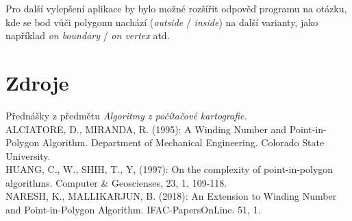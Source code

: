 \documentclass[a4paper,12pt]{article}
\begin{document}
     Pro další vylepšení aplikace by bylo možné rozšířit odpověď programu na otázku, kde se bod vůči polygonu nachází (\emph{outside} / \emph{inside}) na další varianty, jako například \emph{on boundary} / \emph{on vertex}  atd.
    \newpage
    \section{Zdroje}
    Přednášky z předmětu \emph{Algoritmy z počítačové kartografie.}\\

    ALCIATORE, D., MIRANDA, R. (1995): A Winding Number and Point-in-Polygon Algorithm. Department of Mechanical Engineering. Colorado State University.\\

    HUANG, C., W., SHIH, T., Y, (1997): On the complexity of point-in-polygon algorithms. Computer \& Geoscienses, 23, 1, 109-118.\\

    NARESH, K., MALLIKARJUN, B. (2018): An Extension to Winding Number and Point-in-Polygon Algorithm. IFAC-PapersOnLine. 51, 1.

    
\end{document}
